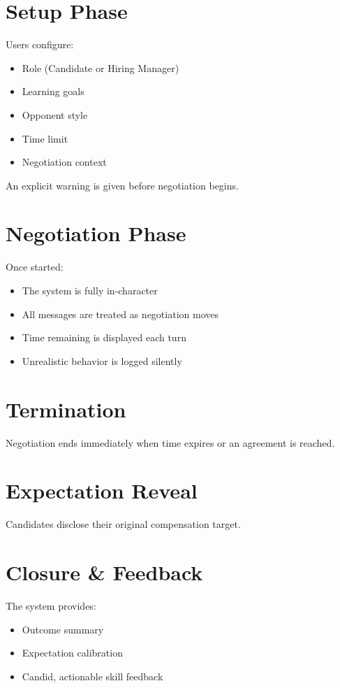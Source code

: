 \documentclass[11pt]{article}
\begin{document}
\section{Setup Phase}

Users configure:
\begin{itemize}
\item Role (Candidate or Hiring Manager)
\item Learning goals
\item Opponent style
\item Time limit
\item Negotiation context
\end{itemize}

An explicit warning is given before negotiation begins.

\section{Negotiation Phase}

Once started:
\begin{itemize}
\item The system is fully in-character
\item All messages are treated as negotiation moves
\item Time remaining is displayed each turn
\item Unrealistic behavior is logged silently
\end{itemize}

\section{Termination}

Negotiation ends immediately when time expires or an agreement is reached.

\section{Expectation Reveal}

Candidates disclose their original compensation target.

\section{Closure \& Feedback}

The system provides:
\begin{itemize}
\item Outcome summary
\item Expectation calibration
\item Candid, actionable skill feedback
\end{itemize}
\end{document}
